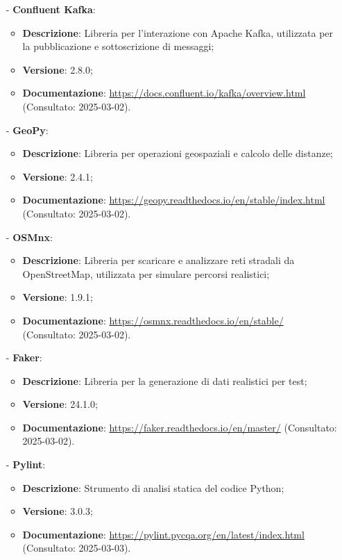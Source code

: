 \documentclass[10pt]{article}
\begin{document}
\begin{itemize}
    \item[-] \textbf{Confluent Kafka}:
    \begin{itemize}
        \item \textbf{Descrizione}: Libreria per l'interazione con Apache Kafka, utilizzata per la pubblicazione e sottoscrizione di messaggi;
        \item \textbf{Versione}: 2.8.0;
        \item \textbf{Documentazione}: \textcolor{blue}{\url{https://docs.confluent.io/kafka/overview.html}} (Consultato: 2025-03-02).
    \end{itemize}

    \item[-] \textbf{GeoPy}:
    \begin{itemize}
        \item \textbf{Descrizione}: Libreria per operazioni geospaziali e calcolo delle distanze;
        \item \textbf{Versione}: 2.4.1;
        \item \textbf{Documentazione}: \textcolor{blue}{\url{https://geopy.readthedocs.io/en/stable/index.html}} (Consultato: 2025-03-02).
    \end{itemize}

    \item[-] \textbf{OSMnx}:
    \begin{itemize}
        \item \textbf{Descrizione}: Libreria per scaricare e analizzare reti stradali da OpenStreetMap, utilizzata per simulare percorsi realistici;
        \item \textbf{Versione}: 1.9.1;
        \item \textbf{Documentazione}: \textcolor{blue}{\url{https://osmnx.readthedocs.io/en/stable/}} (Consultato: 2025-03-02).
    \end{itemize}

    \item[-] \textbf{Faker}:
    \begin{itemize}
        \item \textbf{Descrizione}: Libreria per la generazione di dati realistici per test;
        \item \textbf{Versione}: 24.1.0;
        \item \textbf{Documentazione}: \textcolor{blue}{\url{https://faker.readthedocs.io/en/master/}} (Consultato: 2025-03-02).
    \end{itemize}

    \item[-] \textbf{Pylint}:
    \begin{itemize}
        \item \textbf{Descrizione}: Strumento di analisi statica del codice Python;
        \item \textbf{Versione}: 3.0.3;
        \item \textbf{Documentazione}: \textcolor{blue}{\url{https://pylint.pycqa.org/en/latest/index.html}} (Consultato: 2025-03-03).
    \end{itemize}


\end{itemize}
\end{document}
